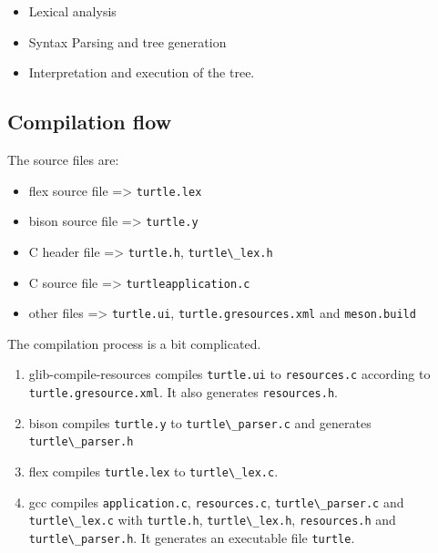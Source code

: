 \begin{itemize}
\tightlist
\item
  Lexical analysis
\item
  Syntax Parsing and tree generation
\item
  Interpretation and execution of the tree.
\end{itemize}

\hypertarget{compilation-flow}{%
\subsection{Compilation flow}\label{compilation-flow}}

The source files are:

\begin{itemize}
\tightlist
\item
  flex source file =\textgreater{} \passthrough{\lstinline!turtle.lex!}
\item
  bison source file =\textgreater{} \passthrough{\lstinline!turtle.y!}
\item
  C header file =\textgreater{} \passthrough{\lstinline!turtle.h!},
  \passthrough{\lstinline!turtle\_lex.h!}
\item
  C source file =\textgreater{}
  \passthrough{\lstinline!turtleapplication.c!}
\item
  other files =\textgreater{} \passthrough{\lstinline!turtle.ui!},
  \passthrough{\lstinline!turtle.gresources.xml!} and
  \passthrough{\lstinline!meson.build!}
\end{itemize}

The compilation process is a bit complicated.

\begin{enumerate}
\def\labelenumi{\arabic{enumi}.}
\tightlist
\item
  glib-compile-resources compiles \passthrough{\lstinline!turtle.ui!} to
  \passthrough{\lstinline!resources.c!} according to
  \passthrough{\lstinline!turtle.gresource.xml!}. It also generates
  \passthrough{\lstinline!resources.h!}.
\item
  bison compiles \passthrough{\lstinline!turtle.y!} to
  \passthrough{\lstinline!turtle\_parser.c!} and generates
  \passthrough{\lstinline!turtle\_parser.h!}
\item
  flex compiles \passthrough{\lstinline!turtle.lex!} to
  \passthrough{\lstinline!turtle\_lex.c!}.
\item
  gcc compiles \passthrough{\lstinline!application.c!},
  \passthrough{\lstinline!resources.c!},
  \passthrough{\lstinline!turtle\_parser.c!} and
  \passthrough{\lstinline!turtle\_lex.c!} with
  \passthrough{\lstinline!turtle.h!},
  \passthrough{\lstinline!turtle\_lex.h!},
  \passthrough{\lstinline!resources.h!} and
  \passthrough{\lstinline!turtle\_parser.h!}. It generates an executable
  file \passthrough{\lstinline!turtle!}.
\end{enumerate}

